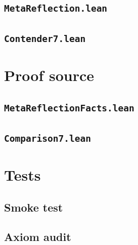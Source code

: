 \documentclass[11pt]{article}
\theoremstyle{definition}
\theoremstyle{remark}
\newcommand{\codepath}[1]{\texttt{#1}}
\begin{document}
\subsection{\codepath{MetaReflection.lean}}


\subsection{\codepath{Contender7.lean}}


\section{Proof source}
\label{app:proofs}

\subsection{\codepath{MetaReflectionFacts.lean}}


\subsection{\codepath{Comparison7.lean}}


\section{Tests}
\label{app:tests}

\subsection{Smoke test}


\subsection{Axiom audit}

\end{document}
